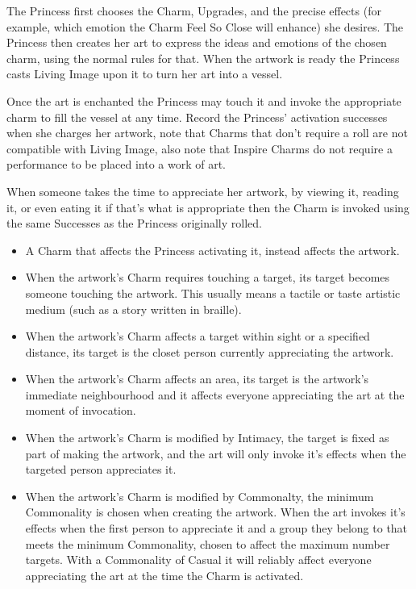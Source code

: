 The Princess first chooses the Charm, Upgrades, and  the precise effects (for example, which emotion the Charm Feel So Close will enhance) she desires. The Princess then creates her art to express the ideas and emotions of the chosen charm, using the normal rules for that. When the artwork is ready the Princess casts Living Image upon it to turn her art into a vessel. 

Once the art is enchanted the Princess may touch it and invoke the appropriate charm to fill the vessel at any time. Record the Princess' activation successes when she charges her artwork, note that Charms that don't require a roll are not compatible with Living Image, also note that Inspire Charms do not require a performance to be placed into a work of art.

When someone takes the time to appreciate her artwork, by viewing it, reading it, or even eating it if that's what is appropriate then the Charm is invoked using the same Successes as the Princess originally rolled. 

\begin{itemize}\item    A Charm that affects the Princess activating it, instead affects the artwork.
\item    When the artwork's Charm requires touching a target, its target becomes someone touching the artwork. This usually means a tactile or taste artistic medium (such as a story written in braille).
\item    When the artwork's Charm affects a target within sight or a specified distance, its target is the closet person currently appreciating the artwork.
\item    When the artwork's Charm affects an area, its target is the artwork's immediate neighbourhood and it affects everyone appreciating the art at the moment of invocation.
\item    When the artwork's Charm is modified by Intimacy, the target is fixed as part of making the artwork, and the art will only invoke it's effects when the targeted person appreciates it.
\item    When the artwork's Charm is modified by Commonalty, the minimum Commonality is chosen when creating the artwork. When the art invokes it's effects when the first person to appreciate it and a group they belong to that meets the minimum Commonality, chosen to affect the maximum number targets. With a Commonality of Casual it will reliably affect everyone appreciating the art at the time the Charm is activated.
\end{itemize}

